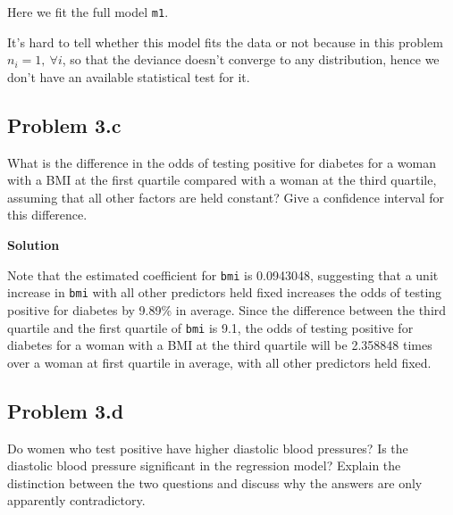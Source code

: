 \documentclass[12pt,oneside,a4paper]{article}\usepackage[]{graphicx}\usepackage[]{xcolor}
\newcommand{\subproblem}[1]
{
    \subsection*{Problem {#1}}
}
\newcommand{\solution}
{
    \vspace{15pt}
    \noindent\ignorespaces\textbf{\large Solution}\par
}
\newcommand{\m}[1]{\texttt{{#1}}}
\begin{document}
Here we fit the full model \m{m1}. 

It's hard to tell whether this model fits the data or not because in this problem $n_{i} = 1,~ \forall i$, so that the deviance doesn't converge to any distribution, hence we don't have an available statistical test for it.

\subproblem{3.c}
What is the difference in the odds of testing positive for diabetes for a woman with a BMI at the first quartile compared with a woman at the third quartile, assuming that all other factors are held constant? Give a confidence interval for this difference.

\solution
Note that the estimated coefficient for \m{bmi} is 0.0943048, suggesting that a unit increase in \m{bmi} with all other predictors held fixed increases the odds of testing positive for diabetes by 9.89\% in average. Since the difference between the third quartile and the first quartile of \m{bmi} is 9.1, the odds of testing positive for diabetes for a woman with a BMI at the third quartile will be 2.358848 times over a woman at first quartile in average, with all other predictors held fixed.

\subproblem{3.d}
Do women who test positive have higher diastolic blood pressures? Is the diastolic blood pressure significant in the regression model? Explain the distinction between the two questions and discuss why the answers are only apparently contradictory.
\end{document}
